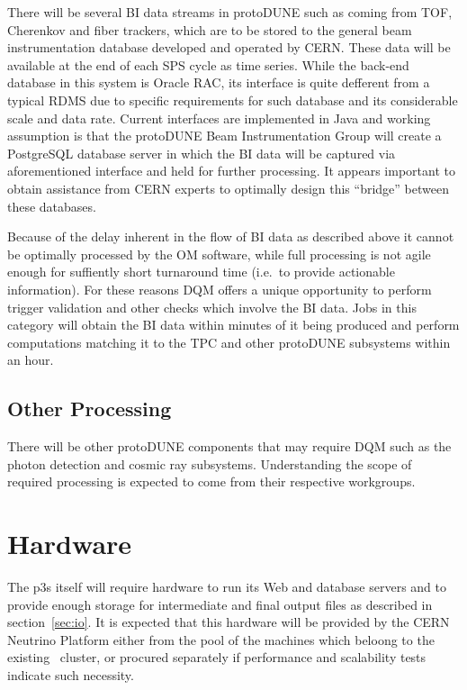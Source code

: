 \documentclass[pdftex,12pt,letter]{article}
\newcommand{\pd}{protoDUNE\xspace}
\begin{document}
There will be several BI data streams in protoDUNE such as coming from TOF, Cherenkov
and fiber trackers, which are to be stored to the general beam instrumentation
database developed and operated by CERN. These data
will be available at the end of each SPS cycle as time series.
While the back-end database in this system is Oracle RAC,
its interface is quite defferent from a typical RDMS due
to specific requirements for such database and its considerable scale
and data rate. Current interfaces
are implemented in Java and working assumption is that
the protoDUNE Beam Instrumentation Group will create
a PostgreSQL database server in which the BI data will be
captured via aforementioned interface and held for further processing.
It appears important to obtain assistance from CERN experts to
optimally design this ``bridge'' between these databases.

Because of the delay  inherent in the flow of BI data as described above
it cannot be optimally processed by the OM software,
while full processing is not agile enough for suffiently short turnaround time (i.e.~to provide
actionable information).
For these reasons DQM offers a unique opportunity to perform
trigger validation and other checks which involve the BI data.
Jobs in this category will obtain the BI data within
minutes of it being produced and perform computations matching it to the TPC and other
\pd subsystems within an hour.

\subsection{Other Processing}
There will be other \pd components that may require DQM such as the photon detection
and cosmic ray subsystems. Understanding the scope of required processing is expected
to come from their respective workgroups.

\section{Hardware}
\label{sec:hardware}
The p3s itself will require hardware to run its Web and database
servers and to provide enough storage for intermediate and final
output files as described in section~\ref{sec:io}.  It is expected
that this hardware will be provided by the CERN Neutrino Platform
either from the pool of the machines which beloong to the
existing~\cite{neut} cluster, or procured separately if performance
and scalability tests indicate such necessity.
\end{document}
